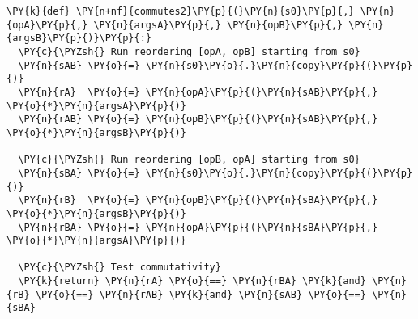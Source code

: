 \begin{Verbatim}[commandchars=\\\{\}]
\PY{k}{def} \PY{n+nf}{commutes2}\PY{p}{(}\PY{n}{s0}\PY{p}{,} \PY{n}{opA}\PY{p}{,} \PY{n}{argsA}\PY{p}{,} \PY{n}{opB}\PY{p}{,} \PY{n}{argsB}\PY{p}{)}\PY{p}{:}
  \PY{c}{\PYZsh{} Run reordering [opA, opB] starting from s0}
  \PY{n}{sAB} \PY{o}{=} \PY{n}{s0}\PY{o}{.}\PY{n}{copy}\PY{p}{(}\PY{p}{)}
  \PY{n}{rA}  \PY{o}{=} \PY{n}{opA}\PY{p}{(}\PY{n}{sAB}\PY{p}{,} \PY{o}{*}\PY{n}{argsA}\PY{p}{)}
  \PY{n}{rAB} \PY{o}{=} \PY{n}{opB}\PY{p}{(}\PY{n}{sAB}\PY{p}{,} \PY{o}{*}\PY{n}{argsB}\PY{p}{)}

  \PY{c}{\PYZsh{} Run reordering [opB, opA] starting from s0}
  \PY{n}{sBA} \PY{o}{=} \PY{n}{s0}\PY{o}{.}\PY{n}{copy}\PY{p}{(}\PY{p}{)}
  \PY{n}{rB}  \PY{o}{=} \PY{n}{opB}\PY{p}{(}\PY{n}{sBA}\PY{p}{,} \PY{o}{*}\PY{n}{argsB}\PY{p}{)}
  \PY{n}{rBA} \PY{o}{=} \PY{n}{opA}\PY{p}{(}\PY{n}{sBA}\PY{p}{,} \PY{o}{*}\PY{n}{argsA}\PY{p}{)}

  \PY{c}{\PYZsh{} Test commutativity}
  \PY{k}{return} \PY{n}{rA} \PY{o}{==} \PY{n}{rBA} \PY{k}{and} \PY{n}{rB} \PY{o}{==} \PY{n}{rAB} \PY{k}{and} \PY{n}{sAB} \PY{o}{==} \PY{n}{sBA}
\end{Verbatim}
